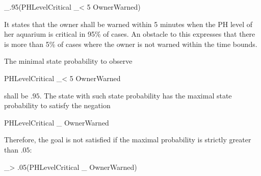       \startformula
        \ltlG {}_{\geq .95}(PHLevelCritical \rightarrow \ltlF_{< 5 } OwnerWarned)
      \stopformula
      
      It states that the owner shall be warned within 5 minutes when the PH
      level of her aquarium is critical in 95\% of cases. An obstacle to this
      expresses that there is more than 5\% of cases where the owner is not
      warned within the time bounds.
      
      The minimal state probability to observe
      
      \startformula PHLevelCritical \rightarrow \ltlF_{< 5 } OwnerWarned \stopformula
      
      shall be $.95$. The state with such state probability has the maximal state probability to satisfy the negation 
      
      \startformula PHLevelCritical \wedge \ltlG_{ } OwnerWarned \stopformula
      
      Therefore, the goal is not satisfied if the maximal probability is strictly
      greater than $.05$:
      
      \startformula
        \ltlF {}_{> .05}(PHLevelCritical \wedge \ltlG_{ } OwnerWarned)
      \stopformula
      
      \stopsubsection
      

      
            \stopsubsection
      
  

